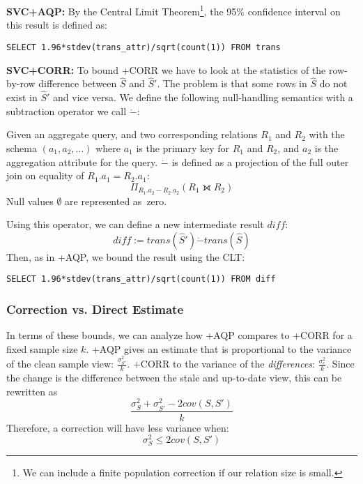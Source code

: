 \vspace{0.25em}

\noindent\textbf{SVC+AQP: } By the Central Limit Theorem\footnote{We can include a finite population correction if our relation size is small.}, the 95\% confidence interval on this result is defined 
as:
\begin{lstlisting}[mathescape,basicstyle={\scriptsize}]
SELECT 1.96*stdev(trans_attr)/sqrt(count(1)) FROM trans
\end{lstlisting}

\vspace{0.25em}

\noindent\textbf{SVC+CORR: } To bound \svcnospace+CORR we have to look at the statistics of the row-by-row difference between $\widehat{S}$ and $\widehat{S}'$. The problem is that some rows in $\widehat{S}$ do not exist in $\widehat{S}'$ and vice versa. We define the following null-handling semantics with a subtraction operator we call $\dot{-}$:
\begin{definition} Given an aggregate query, and two corresponding relations $R_1$ and $R_2$ with the schema $(a_1, a_2, ...)$ where $a_1$ is the primary key for $R_1$ and $R_2$, and $a_2$ is the aggregation attribute for the query. 
$\dot{-}$ is defined as a projection of the full outer join on equality of $R_1.a_1 = R_2.a_1$: \[ \Pi_{R_1.a_2 - R_2.a_2} ( R_1 \fullouterjoin R_2 ) \]
Null values $\emptyset$ are represented as~zero.
\end{definition}
Using this operator, we can define a new intermediate result $diff$:
\[diff := trans(\widehat{S}') \dot{-} trans(\widehat{S}) \]
Then, as in \svcnospace+AQP, we bound the result using the CLT:
\begin{lstlisting}[mathescape,basicstyle={\scriptsize}]
SELECT 1.96*stdev(trans_attr)/sqrt(count(1)) FROM diff
\end{lstlisting}

\subsubsection{Correction vs. Direct Estimate}
In terms of these bounds, we can analyze how \svcnospace+AQP compares to \svcnospace+CORR for a fixed sample size $k$.
\sloppy
\svcnospace+AQP gives an estimate that is proportional to the variance of the clean sample view: 
$\frac{\sigma_{S'}^2}{k}$.
\svcnospace+CORR to the variance of the \emph{differences}: 
$\frac{\sigma_{c}^2}{k}$.
Since the change is the difference between the stale and up-to-date view, this can be rewritten as
\[\frac{\sigma_{S}^2 + \sigma_{S'}^2 - 2cov(S,S')}{k}\]
Therefore, a correction will have less variance when:
\[\sigma_{S}^2 \le 2cov(S,S')\]

